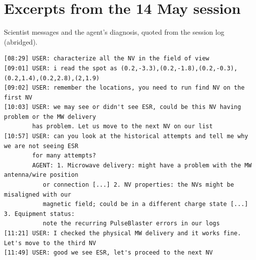 \documentclass[10pt]{article}
\begin{document}
\section{Excerpts from the 14 May session}
\label{app:excerpts}
Scientist messages and the agent's diagnosis, quoted from the session log (abridged).
\begin{Verbatim}[fontsize=\scriptsize,breaklines=true,breakanywhere=true,frame=single,framesep=2mm]
[08:29] USER: characterize all the NV in the field of view
[09:01] USER: i read the spot as (0.2,-3.3),(0.2,-1.8),(0.2,-0.3),(0.2,1.4),(0.2,2.8),(2,1.9)
[09:02] USER: remember the locations, you need to run find NV on the first NV
[10:03] USER: we may see or didn't see ESR, could be this NV having problem or the MW delivery
        has problem. Let us move to the next NV on our list
[10:57] USER: can you look at the historical attempts and tell me why we are not seeing ESR
        for many attempts?
        AGENT: 1. Microwave delivery: might have a problem with the MW antenna/wire position
           or connection [...] 2. NV properties: the NVs might be misaligned with our
           magnetic field; could be in a different charge state [...] 3. Equipment status:
           note the recurring PulseBlaster errors in our logs
[11:21] USER: I checked the physical MW delivery and it works fine. Let's move to the third NV
[11:49] USER: good we see ESR, let's proceed to the next NV
\end{Verbatim}
\end{document}
